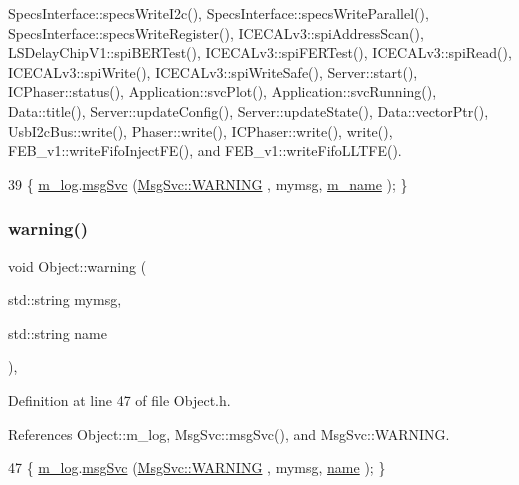 Specs\+Interface\+::specs\+Write\+I2c(), Specs\+Interface\+::specs\+Write\+Parallel(), Specs\+Interface\+::specs\+Write\+Register(), I\+C\+E\+C\+A\+Lv3\+::spi\+Address\+Scan(), L\+S\+Delay\+Chip\+V1\+::spi\+B\+E\+R\+Test(), I\+C\+E\+C\+A\+Lv3\+::spi\+F\+E\+R\+Test(), I\+C\+E\+C\+A\+Lv3\+::spi\+Read(), I\+C\+E\+C\+A\+Lv3\+::spi\+Write(), I\+C\+E\+C\+A\+Lv3\+::spi\+Write\+Safe(), Server\+::start(), I\+C\+Phaser\+::status(), Application\+::svc\+Plot(), Application\+::svc\+Running(), Data\+::title(), Server\+::update\+Config(), Server\+::update\+State(), Data\+::vector\+Ptr(), Usb\+I2c\+Bus\+::write(), Phaser\+::write(), I\+C\+Phaser\+::write(), write(), F\+E\+B\+\_\+v1\+::write\+Fifo\+Inject\+F\+E(), and F\+E\+B\+\_\+v1\+::write\+Fifo\+L\+L\+T\+F\+E().


\begin{DoxyCode}
39 \{ \hyperlink{classObject_a0d269813dd7ac1f24bc143031e2963f2}{m\_log}.\hyperlink{classMsgSvc_ad25f18047920cc59a314e5098259711c}{msgSvc} (\hyperlink{classMsgSvc_ae671eb7301996cd049d2da8a65925926a7cefae88f2ba26b2b05b676a383c834b}{MsgSvc::WARNING} , mymsg, \hyperlink{classObject_a8b83c95c705d2c3ba0d081fe1710f48d}{m\_name} ); \}
\end{DoxyCode}
\mbox{\label{classObject_a11f101db4dd73d9391b0231818881d86}} 
\subsubsection{\texorpdfstring{warning()}{warning()}\hspace{0.1cm}{\footnotesize\ttfamily [2/2]}}
{\footnotesize\ttfamily void Object\+::warning (\begin{DoxyParamCaption}\item[{std\+::string}]{mymsg,  }\item[{std\+::string}]{name }\end{DoxyParamCaption})\hspace{0.3cm}{\ttfamily [inline]}, {\ttfamily [inherited]}}



Definition at line 47 of file Object.\+h.



References Object\+::m\+\_\+log, Msg\+Svc\+::msg\+Svc(), and Msg\+Svc\+::\+W\+A\+R\+N\+I\+NG.


\begin{DoxyCode}
47 \{ \hyperlink{classObject_a0d269813dd7ac1f24bc143031e2963f2}{m\_log}.\hyperlink{classMsgSvc_ad25f18047920cc59a314e5098259711c}{msgSvc} (\hyperlink{classMsgSvc_ae671eb7301996cd049d2da8a65925926a7cefae88f2ba26b2b05b676a383c834b}{MsgSvc::WARNING} , mymsg, \hyperlink{classObject_a300f4c05dd468c7bb8b3c968868443c1}{name} ); \}
\end{DoxyCode}
\mbox{\label{classUsbSpiBus_a3ac9d6f5053ddb8b2f8336f2aa88934e}} 
